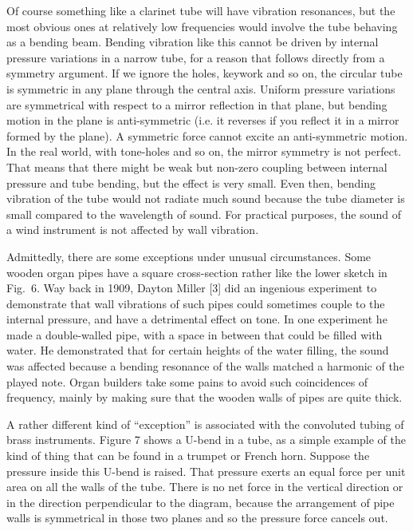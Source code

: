 
  Of course something like a clarinet tube will have vibration resonances, but 
  the most obvious ones at relatively low frequencies would involve the tube 
  behaving as a bending beam. Bending vibration like this cannot be driven by 
  internal pressure variations in a narrow tube, for a reason that follows 
  directly from a symmetry argument. If we ignore the holes, keywork and so on, 
  the circular tube is symmetric in any plane through the central axis. Uniform 
  pressure variations are symmetrical with respect to a mirror reflection in 
  that plane, but bending motion in the plane is anti-symmetric (i.e. it 
  reverses if you reflect it in a mirror formed by the plane). A symmetric 
  force cannot excite an anti-symmetric motion. In the real world, with 
  tone-holes and so on, the mirror symmetry is not perfect. That means that 
  there might be weak but non-zero coupling between internal pressure and tube 
  bending, but the effect is very small. Even then, bending vibration of the 
  tube would not radiate much sound because the tube diameter is small compared 
  to the wavelength of sound. For practical purposes, the sound of a wind 
  instrument is not affected by wall vibration. 

  Admittedly, there are some exceptions under unusual circumstances. Some 
  wooden organ pipes have a square cross-section rather like the lower sketch 
  in Fig.\ 6. Way back in 1909, Dayton Miller [3] did an ingenious experiment 
  to demonstrate that wall vibrations of such pipes could sometimes couple to 
  the internal pressure, and have a detrimental effect on tone. In one 
  experiment he made a double-walled pipe, with a space in between that could 
  be filled with water. He demonstrated that for certain heights of the water 
  filling, the sound was affected because a bending resonance of the walls 
  matched a harmonic of the played note. Organ builders take some pains to 
  avoid such coincidences of frequency, mainly by making sure that the wooden 
  walls of pipes are quite thick. 

  A rather different kind of “exception” is associated with the convoluted 
  tubing of brass instruments. Figure 7 shows a U-bend in a tube, as a simple 
  example of the kind of thing that can be found in a trumpet or French horn. 
  Suppose the pressure inside this U-bend is raised. That pressure exerts an 
  equal force per unit area on all the walls of the tube. There is no net force 
  in the vertical direction or in the direction perpendicular to the diagram, 
  because the arrangement of pipe walls is symmetrical in those two planes and 
  so the pressure force cancels out. 

